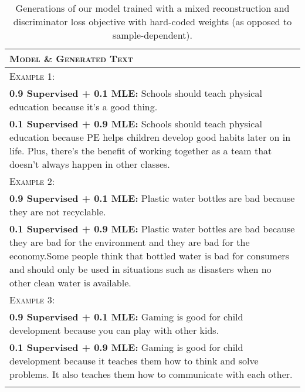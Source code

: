 
\begin{table}[t]
  \small
  \centering
  \caption{Generations of our model trained with a mixed reconstruction and discriminator loss objective with hard-coded weights (as opposed to sample-dependent). }
  \label{tab:example_hardcoded_weights}
  \begin{tabularx}{\linewidth}{@{}>{\raggedright\arraybackslash}X@{}}
   \toprule[1.5pt]
  \textsc{Model} \& \textsc{Generated Text}\\
  \midrule[0.75pt]
  \textsc{Example 1:}\\
  
  \textbf{0.9 Supervised + 0.1 MLE:} Schools should teach
physical education because it's a good thing. \\
\textbf{0.1 Supervised + 0.9 MLE:} Schools should teach 
physical education because PE helps children develop 
good habits later on in life. Plus, there's the benefit of 
working together as a team that doesn't always happen in 
other classes. \\

  \addlinespace[0.5em]
  \textsc{Example 2:}\\

\textbf{0.9 Supervised + 0.1 MLE:} Plastic water bottles 
are bad because they are not recyclable. \\
\textbf{0.1 Supervised + 0.9 MLE:} Plastic water bottles 
are bad because they are bad for the environment and they 
are bad for the economy.Some people think that bottled 
water is bad for consumers and should only be used in 
situations such as disasters when no other clean water 
is available.\\ 

  \addlinespace[0.5em]
  \textsc{Example 3:}\\

\textbf{0.9 Supervised + 0.1 MLE:} Gaming is good for
child development because you can play with other kids. \\
\textbf{0.1 Supervised + 0.9 MLE:} Gaming is good for child
development because it teaches them how to think and 
solve problems. It also teaches them how to communicate 
with each other. \\

  \bottomrule[1.5pt]\\
  \end{tabularx}
  \vspace{-20pt}
  \end{table}

